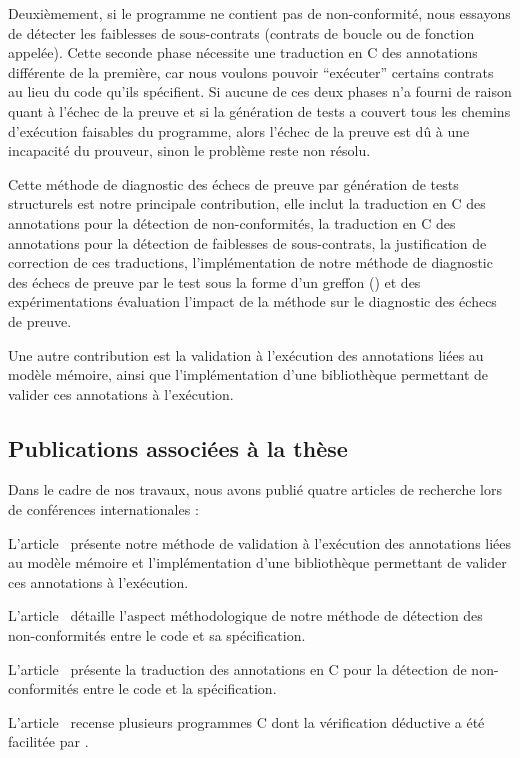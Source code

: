Deuxièmement, si le programme ne contient pas de non-conformité, nous essayons
de détecter les faiblesses de sous-contrats (contrats de boucle ou de fonction
appelée).
Cette seconde phase nécessite une traduction en C des annotations \acsl
différente de la première, car nous voulons pouvoir ``exécuter'' certains
contrats au lieu du code qu'ils spécifient.
Si aucune de ces deux phases n'a fourni de raison quant à l'échec de la preuve
et si la génération de tests a couvert tous les chemins d'exécution faisables
du programme, alors l'échec de la preuve est dû à une incapacité du prouveur,
sinon le problème reste non résolu.

Cette méthode de diagnostic des échecs de preuve par génération de tests
structurels est notre principale contribution, elle inclut la traduction en C
des annotations \acsl pour la détection de non-conformités, la traduction en C
des annotations \acsl pour la détection de faiblesses de sous-contrats, la
justification de correction de ces traductions, l'implémentation de notre
méthode de diagnostic des échecs de preuve par le test sous la forme d'un
greffon \framac (\stady) et des expérimentations évaluation l'impact de la
méthode sur le diagnostic des échecs de preuve.

Une autre contribution est la validation à l'exécution des annotations \acsl
liées au modèle mémoire, ainsi que l'implémentation d'une bibliothèque
permettant de valider ces annotations à l'exécution.


\subsection{Publications associées à la thèse}


Dans le cadre de nos travaux, nous avons publié quatre 
articles de recherche lors de conférences internationales :

L'article~\cite{Kosmatov/RV13} présente notre méthode de validation à
l'exécution des annotations \acsl liées au modèle mémoire et l'implémentation
d'une bibliothèque permettant de valider ces annotations à l'exécution.

L'article~\cite{Petiot/TAP14} détaille l'aspect méthodologique de notre méthode
de détection des non-conformités entre le code et sa spécification.

L'article~\cite{Petiot/SCAM14} présente la traduction des annotations \acsl en
C pour la détection de non-conformités entre le code et la spécification.

L'article~\cite{Genestier/TAP15} recense plusieurs programmes C dont la
vérification déductive a été facilitée par \stady.

